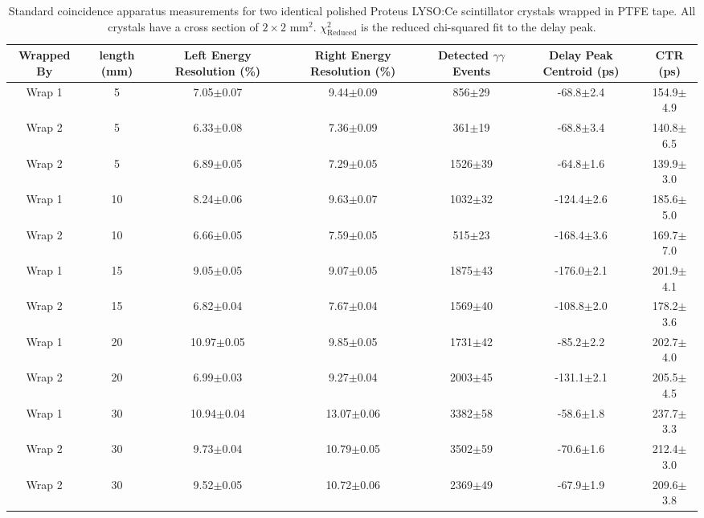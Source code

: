 \begin{table}
\caption{\label{tab:standardctr} Standard coincidence apparatus measurements for two identical polished Proteus LYSO:Ce scintillator crystals wrapped in PTFE tape. All crystals have a cross section of $2\times2$ mm$^2$. $\chi^2_\text{Reduced}$ is the reduced chi-squared fit to the delay peak.}
\begin{tabular}{ccccccc}
\hline
Wrapped By &  length (mm) & Left Energy Resolution (\%) & Right Energy Resolution (\%) & Detected $\gamma\gamma$ Events & Delay Peak Centroid (ps) & CTR (ps)\\
\hline
Wrap 1 &      5 &   7.05$\pm$0.07 &   9.44$\pm$0.09 &   856$\pm$29 &   -68.8$\pm$2.4 &  154.9$\pm$4.9 \\
    Wrap 2 &      5 &   6.33$\pm$0.08 &   7.36$\pm$0.09 &   361$\pm$19 &   -68.8$\pm$3.4 &  140.8$\pm$6.5 \\
    Wrap 2 &      5 &   6.89$\pm$0.05 &   7.29$\pm$0.05 &  1526$\pm$39 &   -64.8$\pm$1.6 &  139.9$\pm$3.0 \\
    Wrap 1 &     10 &   8.24$\pm$0.06 &   9.63$\pm$0.07 &  1032$\pm$32 &  -124.4$\pm$2.6 &  185.6$\pm$5.0 \\
    Wrap 2 &     10 &   6.66$\pm$0.05 &   7.59$\pm$0.05 &   515$\pm$23 &  -168.4$\pm$3.6 &  169.7$\pm$7.0 \\
    Wrap 1 &     15 &   9.05$\pm$0.05 &   9.07$\pm$0.05 &  1875$\pm$43 &  -176.0$\pm$2.1 &  201.9$\pm$4.1 \\
    Wrap 2 &     15 &   6.82$\pm$0.04 &   7.67$\pm$0.04 &  1569$\pm$40 &  -108.8$\pm$2.0 &  178.2$\pm$3.6 \\
    Wrap 1 &     20 &  10.97$\pm$0.05 &   9.85$\pm$0.05 &  1731$\pm$42 &   -85.2$\pm$2.2 &  202.7$\pm$4.0 \\
    Wrap 2 &     20 &   6.99$\pm$0.03 &   9.27$\pm$0.04 &  2003$\pm$45 &  -131.1$\pm$2.1 &  205.5$\pm$4.5 \\
    Wrap 1 &     30 &  10.94$\pm$0.04 &  13.07$\pm$0.06 &  3382$\pm$58 &   -58.6$\pm$1.8 &  237.7$\pm$3.3 \\
    Wrap 2 &     30 &   9.73$\pm$0.04 &  10.79$\pm$0.05 &  3502$\pm$59 &   -70.6$\pm$1.6 &  212.4$\pm$3.0 \\
    Wrap 2 &     30 &   9.52$\pm$0.05 &  10.72$\pm$0.06 &  2369$\pm$49 &   -67.9$\pm$1.9 &  209.6$\pm$3.8 \\
\hline
\end{tabular}
\end{table}


